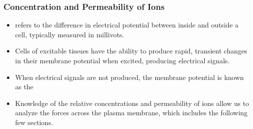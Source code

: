 \documentclass{article}
\numberwithin{equation}{section}
\begin{document}
\subsubsection{Concentration and Permeability of Ions}
\begin{itemize}
    \item {} refers to the difference in electrical potential between inside and outside a cell, typically measured in millivots.
    \item Cells of excitable tissues have the ability to produce rapid, transient changes in their membrane potential when excited, producing electrical signals.
    \item When electrical signals are not produced, the membrane potential is known as the 
    \item Knowledge of the relative concentrations and permeability of ions allow us to analyze the forces across the plasma membrane, which includes the following few sections.
\end{itemize}
\end{document}
